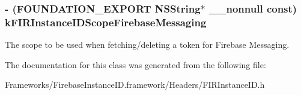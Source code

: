 \subsubsection[{k\+F\+I\+R\+Instance\+I\+D\+Scope\+Firebase\+Messaging}]{\setlength{\rightskip}{0pt plus 5cm}-\/ (F\+O\+U\+N\+D\+A\+T\+I\+O\+N\+\_\+\+E\+X\+P\+O\+R\+T N\+S\+String$\ast$ \+\_\+\+\_\+nonnull const) k\+F\+I\+R\+Instance\+I\+D\+Scope\+Firebase\+Messaging}\label{interface_f_i_r_instance_i_d_a458ffe70dc5bb35b35a38696893840fd}
The scope to be used when fetching/deleting a token for Firebase Messaging. 

The documentation for this class was generated from the following file\+:\begin{DoxyCompactItemize}
\item 
Frameworks/\+Firebase\+Instance\+I\+D.\+framework/\+Headers/F\+I\+R\+Instance\+I\+D.\+h\end{DoxyCompactItemize}
